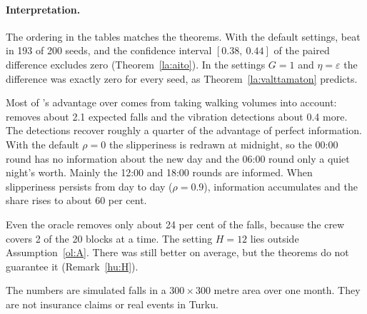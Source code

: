 \paragraph{Interpretation.}
The ordering in the tables matches the theorems. With the default settings,
 beat  in 193 of 200 seeds, and the confidence interval
$[0.38,\ 0.44]$ of the paired difference excludes zero
(Theorem~\ref{la:aito}). In the settings $G = 1$ and $\eta = \varepsilon$ the
difference was exactly zero for every seed, as Theorem~\ref{la:valttamaton}
predicts.

Most of 's advantage over  comes from taking walking
volumes into account:  removes about 2.1 expected falls and the
vibration detections about 0.4 more. The detections recover roughly a quarter
of the advantage of perfect information. With the default $\rho = 0$ the
slipperiness is redrawn at midnight, so the 00:00 round has no information about
the new day and the 06:00 round only a quiet night's worth. Mainly the 12:00 and
18:00 rounds are informed. When slipperiness persists from day to day
($\rho = 0.9$), information accumulates and the share rises to about 60 per cent.

Even the oracle removes only about 24 per cent of the falls, because the crew
covers 2 of the 20 blocks at a time. The setting $H = 12$ lies outside
Assumption~\ref{ol:A}. There  was still better on average, but the
theorems do not guarantee it (Remark~\ref{hu:H}).

The numbers are simulated falls in a $300 \times 300$ metre area over one month.
They are not insurance claims or real events in Turku.
